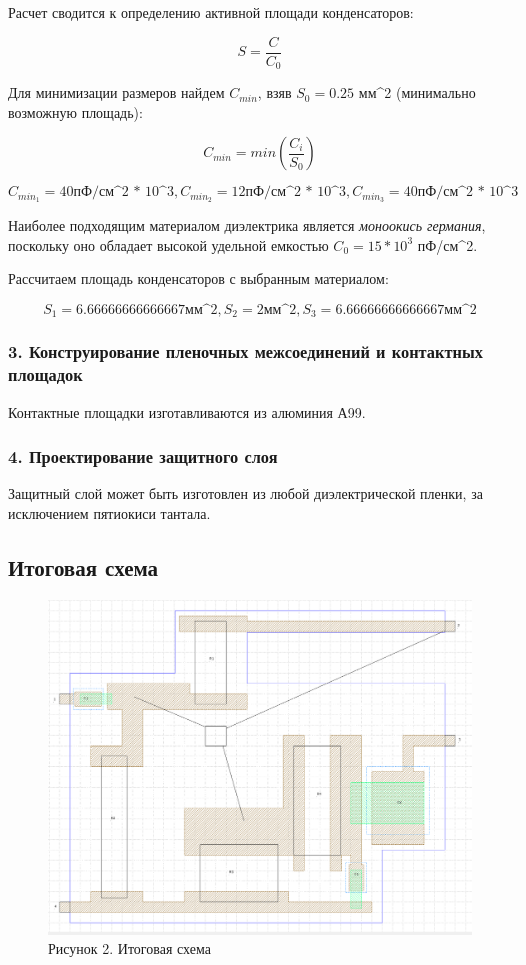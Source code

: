 \documentclass[
]{article}
\begin{document}
Расчет сводится к определению активной площади конденсаторов:

\[S = \frac{C}{C_0}\]

Для минимизации размеров найдем \(C_{min}\), взяв \(S_0 = 0.25\) мм\^{}2
(минимально возможную площадь):

\[C_{min} = min(\frac{C_i}{S_0})\]

\[C_{min_1}=40\text{пФ/см^2 * 10^3},C_{min_2}=12\text{пФ/см^2 * 10^3},C_{min_3}=40\text{пФ/см^2 * 10^3}\]

Наиболее подходящим материалом диэлектрика является \emph{моноокись
германия}, поскольку оно обладает высокой удельной емкостью
\(C_0 = 15 * 10^3\) пФ/см\^{}2.

Рассчитаем площадь конденсаторов с выбранным материалом:

\[S_1=6.66666666666667\text{мм^2},S_2=2\text{мм^2},S_3=6.66666666666667\text{мм^2}\]

\subsubsection{3. Конструирование пленочных межсоединений и контактных
площадок}\label{ux43aux43eux43dux441ux442ux440ux443ux438ux440ux43eux432ux430ux43dux438ux435-ux43fux43bux435ux43dux43eux447ux43dux44bux445-ux43cux435ux436ux441ux43eux435ux434ux438ux43dux435ux43dux438ux439-ux438-ux43aux43eux43dux442ux430ux43aux442ux43dux44bux445-ux43fux43bux43eux449ux430ux434ux43eux43a}

Контактные площадки изготавливаются из алюминия А99.

\subsubsection{4. Проектирование защитного
слоя}\label{ux43fux440ux43eux435ux43aux442ux438ux440ux43eux432ux430ux43dux438ux435-ux437ux430ux449ux438ux442ux43dux43eux433ux43e-ux441ux43bux43eux44f}

Защитный слой может быть изготовлен из любой диэлектрической пленки, за
исключением пятиокиси тантала.

\subsection{Итоговая
схема}\label{ux438ux442ux43eux433ux43eux432ux430ux44f-ux441ux445ux435ux43cux430}

\begin{figure}
\centering
\includegraphics{HW1/myschema.png}
\caption{Рисунок 2. Итоговая схема}
\end{figure}
\end{document}
